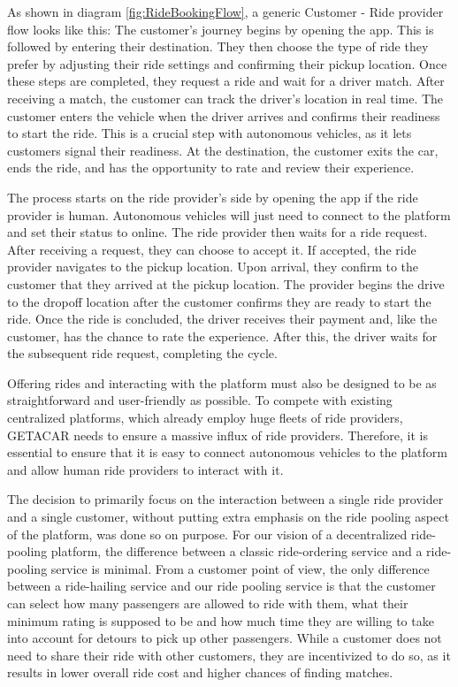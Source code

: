 As shown in diagram \ref{fig:RideBookingFlow}, a generic Customer - Ride provider flow looks like this:
The customer's journey begins by opening the app. This is followed by entering their destination. They then choose the type of ride they prefer by adjusting their ride settings and confirming their pickup location. Once these steps are completed, they request a ride and wait for a driver match. After receiving a match, the customer can track the driver's location in real time. The customer enters the vehicle when the driver arrives and confirms their readiness to start the ride. This is a crucial step with autonomous vehicles, as it lets customers signal their readiness. At the destination, the customer exits the car, ends the ride, and has the opportunity to rate and review their experience.

The process starts on the ride provider's side by opening the app if the ride provider is human. Autonomous vehicles will just need to connect to the platform and set their status to online. The ride provider then waits for a ride request. After receiving a request, they can choose to accept it. If accepted, the ride provider navigates to the pickup location. Upon arrival, they confirm to  the customer that they arrived at the pickup location. The provider begins the drive to the dropoff location after the customer confirms they are ready to start the ride. Once the ride is concluded, the driver receives their payment and, like the customer, has the chance to rate the experience. After this, the driver waits for the subsequent ride request, completing the cycle.

Offering rides and interacting with the platform must also be designed to be as straightforward and user-friendly as possible. To compete with existing centralized platforms, which already employ huge fleets of ride providers, GETACAR needs to ensure a massive influx of ride providers. Therefore, it is essential to ensure that it is easy to connect autonomous vehicles to the platform and allow human ride providers to interact with it. 

The decision to primarily focus on the interaction between a single ride provider and a single customer, without putting extra emphasis on the ride pooling aspect of the platform, was done so on purpose. For our vision of a decentralized ride-pooling platform, the difference between a classic ride-ordering service and a ride-pooling service is minimal. From a customer point of view, the only difference between a ride-hailing service and our ride pooling service is that the customer can select how many passengers are allowed to ride with them, what their minimum rating is supposed to be and how much time they are willing to take into account for detours to pick up other passengers. While a customer does not need to share their ride with other customers, they are incentivized to do so, as it results in lower overall ride cost and higher chances of finding matches. 

